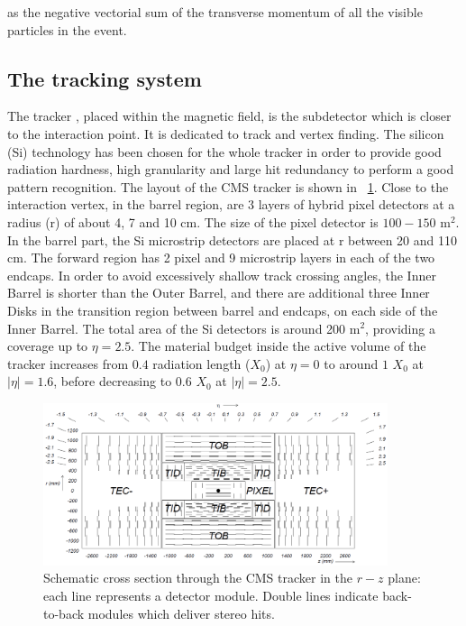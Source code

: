 as the negative vectorial sum of the transverse momentum of all the visible particles in the event.




\subsection{The tracking system}
\label{sec:tracker}
The tracker \cite{Tracker_1, Tracker_2} , placed within the magnetic field, is the subdetector which is closer to the interaction point. It is dedicated to track and vertex finding. The silicon (Si) technology has been chosen for the whole tracker in order to provide good radiation hardness, high granularity and large hit redundancy to perform a good pattern recognition. The layout of the CMS tracker is shown in \figurename~\ref{tracking_system}. Close to the interaction vertex, in the barrel region, are 3 layers of hybrid pixel detectors at a radius (r) of about 4, 7 and 10 cm. The size of the pixel detector is $100-150$ m$^2$. In the barrel part, the Si microstrip detectors are placed at r between 20 and 110 cm. The forward region has 2 pixel and 9 microstrip layers in each of the two endcaps. In order to avoid excessively shallow track crossing angles, the Inner Barrel is shorter than the Outer Barrel, and there are additional three Inner Disks in the transition region between barrel and endcaps, on each side of the Inner Barrel. The total area of the Si detectors is around 200 m$^2$, providing a coverage up to $\eta = 2.5$. The material budget inside the active volume of the tracker increases from $0.4$ radiation length ($X_0$) at $\eta= 0$ to around $1$  $X_0$ at $|\eta|= 1.6$, before decreasing to $0.6$ $X_0$ at $|\eta|= 2.5$. \\
\begin{figure}[h!]
 \centering
 \includegraphics[width=0.9\textwidth]{Images/cmsTracker_TrackerLayout}
\caption{Schematic cross section through the CMS tracker in the $r-z$ plane: each line represents a detector module. Double lines indicate back-to-back modules which deliver stereo hits.}
\label{tracking_system}
\end{figure}
